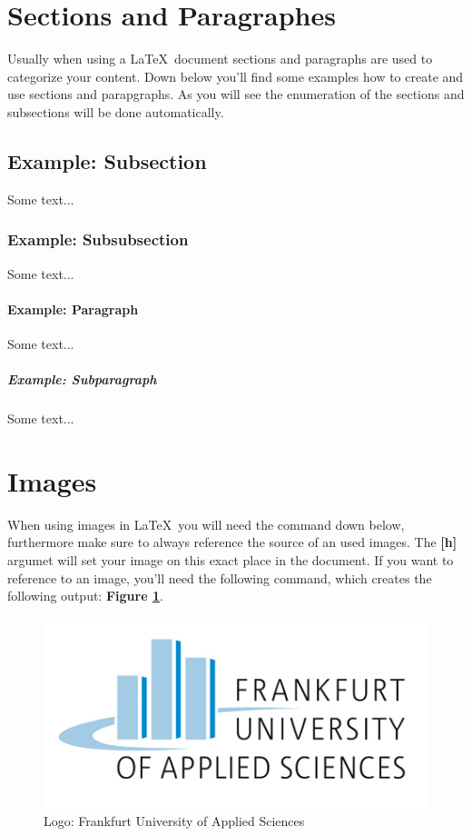 \documentclass[]{article}
\begin{document}
\section{Sections and Paragraphes}
Usually when using a \LaTeX\ document sections and paragraphs are used to categorize your content. Down below you'll find some examples how to create and use sections and parapgraphs. As you will see the enumeration of the sections and subsections will be done automatically. 

\subsection{Example: Subsection}
Some text...

\subsubsection{Example: Subsubsection}
Some text...

\paragraph{Example: Paragraph}
Some text...

\subparagraph{Example: Subparagraph}
Some text...


\section{Images}
When using images in \LaTeX\ you will need the command down below, furthermore make sure to always reference the source of an used images. The \textbf{[h]} argumet will set your image on this exact place in the document. If you want to reference to an image, you'll need the following command, which creates the following output: \textbf{Figure \ref{img:fra_logo}}.
	\begin{figure}[h]
		\centering
		\includegraphics[scale=0.40]{images/logo}
		\caption{Logo: Frankfurt University of Applied Sciences}
		\label{img:fra_logo}
	\end{figure}
\end{document}
